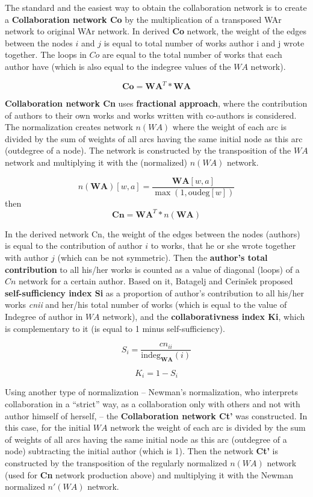 \documentclass[11pt]{article} %
\begin{document}
The standard and the easiest way to obtain the collaboration network is to create a \textbf{Collaboration network Co} \citep{OnBibl} by the multiplication of a transposed WAr network to original WAr network. In derived \textbf{Co} network, the weight of the edges between the nodes $i$ and $j$ is equal to total number of works author i and j wrote together. The loops in $Co$ are equal to the total number of works that each author have (which is also equal to the indegree values of the $WA$ network).  \medskip 

\[ \mathbf{Co} = \mathbf{WA}^T * \mathbf{WA} \] 

\textbf{Collaboration network Cn} uses \textbf{fractional approach}, where the contribution of authors to their own works and works written with co-authors is considered. The normalization creates network $n(WA)$ where the weight of each arc is divided by the sum of weights of all arcs having the same initial node as this arc (outdegree of a node). The network is constructed by the transposition of the $WA$ network and multiplying it with the (normalized) $n(WA)$ network.\smallskip

\[ n(\mathbf{WA})[w,a] = \frac {\mathbf{WA}[w,a]}{\max(1,\textrm{oudeg}[w])}\]
then 
\[ \mathbf{Cn} = \mathbf{WA}^T * n(\mathbf{WA}) \] 
\medskip
 
In the derived network Cn, the weight of the edges between the nodes (authors) is equal to the contribution of author $i$ to works, that he or she wrote together with author $j$ (which can be not symmetric). Then the \textbf{author's total contribution} to all his/her works is counted as a value of diagonal (loops) of a $Cn$ network for a certain author. Based on it, Batagelj and Cerinšek \citep{OnBibl} proposed \textbf{self-sufficiency index Si} as a proportion of author's contribution to all his/her works \textit{cnii} and her/his total number of works (which is equal to the value of Indegree of author in $WA$ network), and the \textbf{collaborativness index Ki}, which is complementary to it (is equal to 1 minus self-sufficiency). \medskip 

\[ \mathit{S_i} = \frac{\mathit{cn_{ii}}}{\textrm{indeg}_\mathbf{WA}(i)}\]

\[ \mathit{K_i} = \mathit{\textrm{1} - S_i} \]

Using another type of normalization -- Newman's normalization, who interprets collaboration in a “strict” way, as a collaboration only with others and not with author himself of herself, -- the \textbf{Collaboration network Ct'} was constructed.  In this case, for the initial $WA$ network the weight of each arc is divided by the sum of weights of all arcs having the same initial node as this arc (outdegree of a node) subtracting the initial author (which is 1). Then the network \textbf{Ct'} is constructed by the transposition of the regularly normalized $n(WA)$ network (used for \textbf{Cn} network production above) and multiplying it with the Newman normalized $n'(WA)$ network. \smallskip
\end{document}
